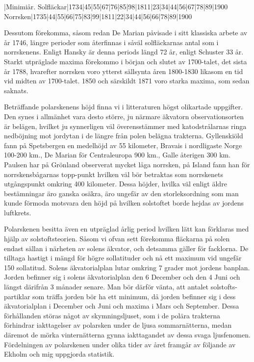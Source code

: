 \documentclass[a4paper, 12pt, oneside, swedish]{article}
\begin{document}
|Minimiår.  
Solfläckar|1734|45|55|67|76|85|98|1811|23|34|44|56|67|78|89|1900  
Norrsken|1735|44|55|66|75|83|99|1811|22|34|44|56|66|78|89|1900  

Dessutom förekomma, såsom redan De Marian påvisade i sitt klassiska arbete av år 1746, längre perioder som återfinnas i såväl solfläckarnas antal som i norrskenens. Enligt Hansky är denna periods längd 72 år, enligt Schuster 33 år. Starkt utpräglade maxima förekommo i början och slutet av 1700-talet, det sista år 1788, hvarefter norrsken voro ytterst sällsynta åren 1800-1830 likasom en tid vid midten av 1700-talet. 1850 och särskildt 1871 voro starka maxima, som sedan saknats.

Beträffande polarskenens höjd finna vi i litteraturen högst olikartade uppgifter. Den synes i allmänhet vara desto större, ju närmare äkvatorn observationsorten är belägen, hvilket ju synnerligen väl överensstämmer med katodstrålarnas ringa nedböjning mot jordytan i de längre från polen belägna trakterna. Gyllenskiöld fann på Spetsbergen en medelhöjd av 55 kilometer, Bravais i nordligaste Norge 100-200 km., De Marian för Centraleuropa 900 km., Galle återigen 300 km. Paulsen har på Grönland observerat mycket låga norrsken, på Island fann han för norrskensbågarnas topp-punkt hvilken väl bör betraktas som norrskenets utgångspunkt omkring 400 kilometer. Dessa höjder, hvilka väl enligt äldre bestämningar äro ganska osäkra, äro ungefär av den storleksordning som man kunde förmoda motsvara den höjd på hvilken solstoftet borde hejdas av jordens luftkrets.

Polarskenen besitta även en utpräglad årlig period hvilken lätt kan förklaras med hjälp av solstoftsteorien. Såsom vi ofvan sett förekomma fläckarna på solen endast sällan i närheten av solens äkvator, och detsamma gäller för facklorna. De tilltaga hastigt i mängd för högre sollatituder och nå ett maximum vid ungefär 150 sollatitud. Solens äkvatorialplan lutar omkring 7 grader mot jordens banplan. Jorden befinner sig i solens äkvatorialplan den 6 December och den 4 Juni och längst därifrån 3 månader senare. Man bör därför vänta, att antalet solstofts-partiklar som träffa jorden bör ha ett minimum, då jorden befinner sig i dess äkvatorialplan i December och Juni och maxima i Mars och September. Dessa förhållanden störas något av skymningsljuset, som i de polära trakterna förhindrar iakttagelser av polarsken under de ljusa sommarnätterna, medan däremot de mörka vinternätterna gynna iakttagandet av dessa svaga ljusfenomen. Fördelningen av polarskenen under olika tider av året framgår av följande av Ekholm och mig uppgjorda statistik.
\end{document}
